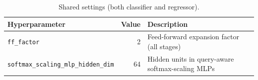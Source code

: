 \begin{table}[H]
\centering
\small
\caption{Shared settings (both classifier and regressor).}
\begin{tabular}{lrl}
\toprule
\textbf{Hyperparameter} & \textbf{Value} & \textbf{Description} \\
\midrule
\texttt{ff\_factor}                         & 2    & Feed-forward expansion factor (all stages) \\
\texttt{softmax\_scaling\_mlp\_hidden\_dim} & 64   & Hidden units in query-aware softmax-scaling MLPs \\
\bottomrule
\end{tabular}
\end{table}







